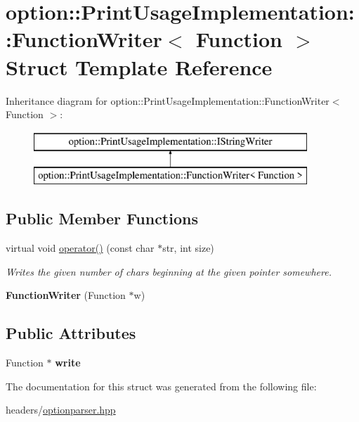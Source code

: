 \hypertarget{structoption_1_1PrintUsageImplementation_1_1FunctionWriter}{}\section{option\+:\+:Print\+Usage\+Implementation\+:\+:Function\+Writer$<$ Function $>$ Struct Template Reference}
\label{structoption_1_1PrintUsageImplementation_1_1FunctionWriter}
Inheritance diagram for option\+:\+:Print\+Usage\+Implementation\+:\+:Function\+Writer$<$ Function $>$\+:\begin{figure}[H]
\begin{center}
\leavevmode
\includegraphics[height=2.000000cm]{structoption_1_1PrintUsageImplementation_1_1FunctionWriter}
\end{center}
\end{figure}
\subsection*{Public Member Functions}
\begin{DoxyCompactItemize}
\item 
\mbox{\label{structoption_1_1PrintUsageImplementation_1_1FunctionWriter_aa8e8f237845e210e36ca431d7e503a70}} 
virtual void \hyperlink{structoption_1_1PrintUsageImplementation_1_1FunctionWriter_aa8e8f237845e210e36ca431d7e503a70}{operator()} (const char $\ast$str, int size)
\begin{DoxyCompactList}\small\item\em Writes the given number of chars beginning at the given pointer somewhere. \end{DoxyCompactList}\item 
\mbox{\label{structoption_1_1PrintUsageImplementation_1_1FunctionWriter_adc6c3f7ba11b3cad65c018955bab47e5}} 
{\bfseries Function\+Writer} (Function $\ast$w)
\end{DoxyCompactItemize}
\subsection*{Public Attributes}
\begin{DoxyCompactItemize}
\item 
\mbox{\label{structoption_1_1PrintUsageImplementation_1_1FunctionWriter_a3442e05eb04d2b1ee321193f5b10557b}} 
Function $\ast$ {\bfseries write}
\end{DoxyCompactItemize}


The documentation for this struct was generated from the following file\+:\begin{DoxyCompactItemize}
\item 
headers/\hyperlink{optionparser_8hpp}{optionparser.\+hpp}\end{DoxyCompactItemize}
